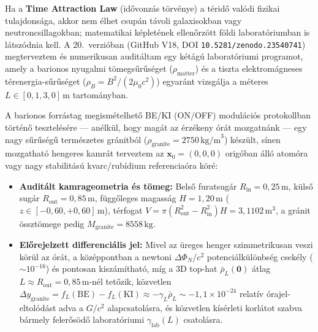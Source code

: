 
Ha a \textbf{Time Attraction Law} (id\H{o}vonz\'as t\"orv\'enye) a t\'erid\H{o} val\'odi fizikai tulajdons\'aga, akkor nem \'elhet csup\'an t\'avoli galaxisokban vagy neutroncsillagokban; matematikai k\'eplet\'enek ellen\H{o}rz\"ott f\"oldi laborat\'oriumban is l\'atsz\'odnia kell. A 20.\ verzi\'oban (GitHub V18, DOI \texttt{10.5281/zenodo.23540741}) megterveztem \'es numerikusan audit\'altam egy k\'et\'ag\'u laborat\'oriumi programot, amely a barionos nyugalmi t\"omegs\H{u}r\H{u}s\'eget ($\rho_{\text{matter}}$) \'es a tiszta elektrom\'agneses t\'erenergia-s\H{u}r\H{u}s\'eget ($\rho_B = B^2/(2\mu_0 c^2)$) egyar\'ant vizsg\'alja a m\'eteres $L \in [0{,}1, 3{,}0]\,\text{m}$ tartom\'anyban.

\par
A barionos forr\'astag megism\'etelhet\H{o} BE/KI (ON/OFF) modul\'aci\'os protokollban t\"ort\'en\H{o} tesztel\'es\'ere --- an\'elk\"ul, hogy mag\'at az \'erz\'ekeny \'or\'at mozgatn\'ank --- egy nagy s\H{u}r\H{u}s\'eg\H{u} term\'eszetes gr\'anitb\'ol ($\rho_{\text{granite}} = 2750\,\text{kg/m}^3$) k\'esz\"ult, s\'inen mozgathat\'o hengeres kamr\'at terveztem az $\mathbf{x}_0 = (0,0,0)$ orig\'oban \'all\'o atom\'ora vagy nagy stabilit\'as\'u kvarc/rub\'idium referencia\'ora k\"or\'e:
\begin{itemize}\setlength{\itemsep}{1pt}\setlength{\parskip}{0pt}\setlength{\topsep}{1pt}
  \item \textbf{Audit\'alt kamrageometria \'es t\"omeg:} Bels\H{o} furatsug\'ar $R_{\text{in}} = 0{,}25\,\text{m}$, k\"uls\H{o} sug\'ar $R_{\text{out}} = 0{,}85\,\text{m}$, f\"ugg\H{o}leges magass\'ag $H = 1{,}20\,\text{m}$ ($z \in [-0{,}60, +0{,}60]\,\text{m}$), t\'erfogat $V = \pi(R_{\text{out}}^2 - R_{\text{in}}^2)H = 3{,}1102\,\text{m}^3$, a gr\'anit \"osszt\"omege pedig \textbf{$M_{\text{granite}} = 8558\,\text{kg}$}.
  \item \textbf{El\H{o}rejelzett differenci\'alis jel:} Mivel az \"ureges henger szimmetrikusan veszi k\"or\"ul az \'or\'at, a k\"oz\'eppontban a newtoni $\Delta\Phi_N/c^2$ potenci\'alk\"ul\"onbs\'eg csek\'ely ($\sim 10^{-16}$) \'es pontosan kisz\'am\'ithat\'o, m\'ig a 3D top-hat $\bar{\rho}_L(\mathbf{0})$ \'atlag $L \approx R_{\text{out}} = 0{,}85\,\text{m}$-n\'el tet\H{o}zik, k\"ozvetlen $\Delta y_{\text{granite}} = f_L(\text{BE}) - f_L(\text{KI}) \approx -\gamma_L\bar{\rho}_L \sim -1{,}1\times 10^{-24}$ relat\'iv \'orajel-eltol\'od\'ast adva a $G/c^2$ alapcsatol\'asra, \'es k\"ozvetlen k\'is\'erleti korl\'atot szabva b\'armely feler\H{o}s\"od\H{o} laborat\'oriumi $\gamma_{\text{lab}}(L)$ csatol\'asra.
\end{itemize}

